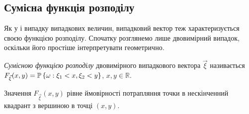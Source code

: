 \subsection{Сумісна функція розподілу}
Як у і випадку випадкових величин, випадковий вектор теж характеризується своєю функцією розподілу.
Спочатку розглянемо лише двовимірний випадок, оскільки його простіше інтерпретувати геометрично.
\begin{definition} 
    \emph{Сумісною функцією розподілу} двовимірного випадкового вектора $\vec{\xi}$ 
    називається $F_{\vec{\xi}}(x, y) = \P\left\{\omega: \xi_1 < x, \xi_2 < y\right\}$, $x, y \in \mathbb{R}$.
\end{definition}
Значення $F_{\vec{\xi}}(x, y)$ рівне ймовірності 
    потрапляння точки в нескінченний квадрант з вершиною в точці $(x, y)$.
\begin{center}
\end{center}

